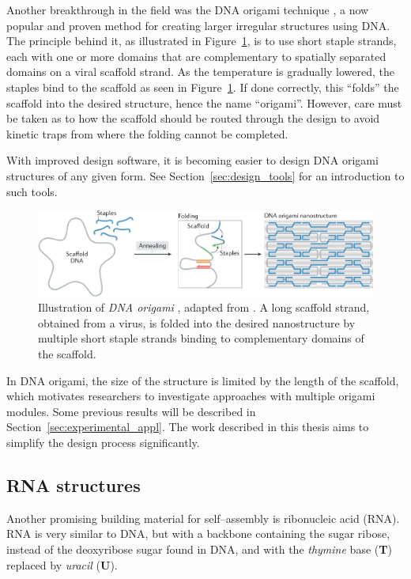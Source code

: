 
Another breakthrough in the field was the DNA origami technique \cite{rothemund2006folding}, a now popular and proven method for creating larger irregular structures using DNA. The principle behind it, as illustrated in Figure~\ref{fig:dnaOrigami}, is to use short staple strands, each with one or more domains that are complementary to spatially separated domains on a viral scaffold strand. As the temperature is gradually lowered, the staples bind to the scaffold as seen in Figure~\ref{fig:dnaOrigami}. If done correctly, this ``folds'' the scaffold into the desired structure, hence the name ``origami''. However, care must be taken as to how the scaffold should be routed through the design to avoid kinetic traps from where the folding cannot be completed.

With improved design software, it is becoming easier to design DNA origami structures of any given form. See Section~\ref{sec:design_tools} for an introduction to such tools.

\begin{figure}
    \centering
    \includegraphics[width=\textwidth]{figures/dna_origami.png}
    \caption{Illustration of \emph{DNA origami} \cite{rothemund2006folding}, adapted from \cite{dey2021dna}. A long scaffold strand, obtained from a virus, is folded into the desired nanostructure by multiple short staple strands binding to complementary domains of the scaffold.
    }
    \label{fig:dnaOrigami}
\end{figure}

In DNA origami, the size of the structure is limited by the length of the scaffold, which motivates researchers to investigate approaches with multiple origami modules. Some previous results will be described in Section~\ref{sec:experimental_appl}. The work described in this thesis aims to simplify the design process significantly.

\subsection{RNA structures}
\label{sec:RNA_design}
Another promising building material for self--assembly is ribonucleic acid (RNA). RNA is very similar to DNA, but with a backbone containing the sugar ribose, instead of the deoxyribose sugar found in DNA, and with the \emph{thymine} base (\textbf{T}) replaced by \emph{uracil} (\textbf{U}).

